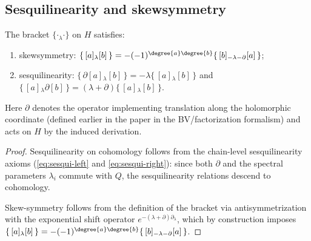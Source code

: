 \subsection{Sesquilinearity and skewsymmetry}

\begin{proposition}%
The bracket $\{\cdot {}_\lambda \cdot\}$ on $H$ satisfies:
\begin{enumerate}[label=(\alph*),leftmargin=2em]
 \item skewsymmetry: $\{\, [a] {}_\lambda [b] \,\} = - (-1)^{\degree{a}\degree{b}} \{\, [b] {}_{-\lambda-\partial} [a] \,\}$;
 \item sesquilinearity: $\{\,\partial [a] {}_\lambda [b] \,\} = -\lambda \{\, [a] {}_\lambda [b] \,\}$ and $\{\, [a] {}_\lambda \partial [b] \,\} = (\lambda+\partial)\{\, [a] {}_\lambda [b] \,\}$.
\end{enumerate}
Here $\partial$ denotes the operator implementing translation along the holomorphic coordinate (defined earlier in the paper in the BV/factorization formalism) and acts on $H$ by the induced derivation.
\end{proposition}
\begin{proof}
Sesquilinearity on cohomology follows from the chain-level sesquilinearity axioms (\eqref{eq:sesqui-left} and \eqref{eq:sesqui-right}): since both $\partial$ and the spectral parameters $\lambda_i$ commute with $Q$, the sesquilinearity relations descend to cohomology.

Skew-symmetry follows from the definition of the bracket via antisymmetrization with the exponential shift operator $e^{-(\lambda+\partial)\partial_\lambda}$, which by construction imposes $\{\, [a] {}_\lambda [b] \,\} = -(-1)^{\degree{a}\degree{b}}\{\, [b] {}_{-\lambda-\partial} [a] \,\}$.
\end{proof}

